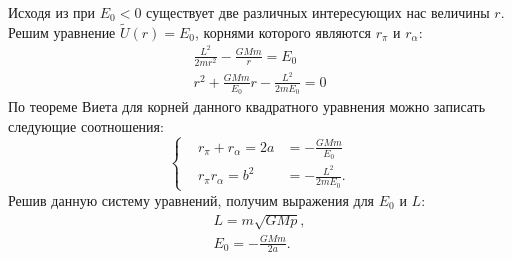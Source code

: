Исходя из  при $E_0<0$ существует две различных интересующих нас величины $r$. 
Решим уравнение $\tilde{U}(r) = E_0$, корнями которого являются $r_{\pi}$ и $r_{\alpha}$:
\begin{gather*}
	\frac{L^2}{2mr^2} - \frac{GMm}{r} = E_0 \\
	r^2 + \frac{GMm}{E_0}r - \frac{L^2}{2m E_0} = 0
\end{gather*}
По теореме Виета для корней данного квадратного уравнения можно записать следующие соотношения:
\begin{equation*}
\left\{\begin{aligned}
&r_\pi+r_\alpha=2 a & =-\frac{G M m}{E_0} \\
&r_\pi r_\alpha=b^2 & =-\frac{L^2}{2 m E_0} .
\end{aligned}\right.
\end{equation*}
Решив данную систему уравнений, получим выражения для $E_0$ и $L$:
\begin{gather}
	L = m \sqrt{GMp}, \\
	E_0 = -\frac{GMm}{2a}.
	\label{eq:total-orbit-energy}
\end{gather}







